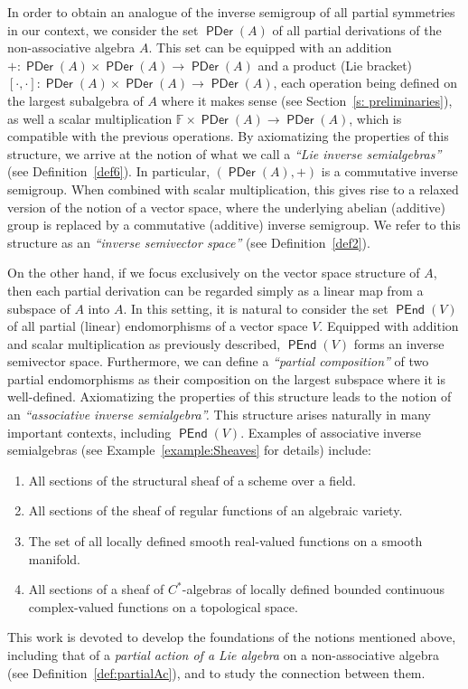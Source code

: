 \documentclass{amsart}
\newcommand{\F}{\mathbb{F}}
\newcommand{\0}{{\vartheta}}
\theoremstyle{definition}
\theoremstyle{remark}
\numberwithin{equation}{section}
\newtheorem*{Theorem A}{\textbf{Theorem A}}
\newtheorem*{Corollary E}{\textbf{Corollary E}}
\newtheorem*{Corollary F}{\textbf{Corollary F}}
\newtheorem*{Theorem B}{\textbf{Theorem B}}
\newtheorem*{Theorem C}{\textbf{Theorem C}}
\newtheorem*{Theorem D}{\textbf{Theorem B}}
\newtheorem*{p a}{\textbf{Proof of  Theorem A}}
\newtheorem*{p b}{\textbf{Proof of Theorem B}}
\newtheorem*{p c}{\textbf{Proof of  Theorem C}}
\newtheorem*{p d}{\textbf{Proof of  Theorem D}}
\DeclareMathOperator{\pen}{\textsf{PEnd}}
\DeclareMathOperator{\pde}{\textsf{PDer}}
\begin{document}
In order to obtain an analogue of the inverse semigroup of all partial symmetries in our context, we consider the set $\pde(A)$ of all partial derivations of the non-associative algebra $A$. This set can be equipped with an addition $+:\pde(A)\times \pde(A)\to \pde(A)$ and a product (Lie bracket) $[\cdot,\cdot]:\pde(A)\times \pde(A)\to \pde(A)$, each operation being defined on the largest subalgebra of $A$ where it makes sense (see Section~\ref{s: preliminaries}), as well a  scalar multiplication $\F\times \pde(A)\to \pde(A)$, which is compatible with the previous operations. By axiomatizing the properties of this structure, we arrive at the  notion of what we call a {\em ``Lie inverse semialgebras''} (see Definition~\ref{def6}). In particular, $(\pde(A),+)$ is a commutative inverse semigroup. When combined with scalar multiplication, this gives rise to a relaxed version of the notion of a vector space, where the underlying abelian (additive) group is replaced by a commutative (additive) inverse semigroup. We refer to this structure as an {\em ``inverse semivector space''} (see Definition~\ref{def2}).

On the other hand, if we focus exclusively on the vector space structure of $A$, then each partial derivation can be regarded simply as a linear map from a subspace of $A$ into $A$. In this setting, it is natural to consider the set $\pen(V)$ of all partial (linear) endomorphisms of a vector space $V.$ Equipped with addition and scalar multiplication as previously described, $\pen(V)$ forms an inverse semivector space. Furthermore, we can define a {\em ``partial composition''} of two partial endomorphisms as their composition on the largest subspace where it is well-defined. Axiomatizing the properties of this structure leads to the notion of an {\em ``associative inverse semialgebra''.} This structure arises naturally in many important contexts,  including  $\pen(V).$ Examples of associative inverse semialgebras (see Example~\ref{example:Sheaves} for details)
include:
\begin{enumerate}
\item  All sections of the structural sheaf of a scheme  over  a field.
\item All sections of the sheaf of regular functions of an algebraic variety.
\item The set of all locally defined smooth real-valued functions on a smooth manifold.
\item All sections of a sheaf of $C^*$-algebras of locally defined bounded continuous complex-valued functions on a topological space.
\end{enumerate}
 This work is devoted to develop the foundations of the notions mentioned above, including that  of  a \emph{partial action of a Lie algebra} on a non-associative algebra (see Definition~\ref{def:partialAc}), and to study the connection between them.
\end{document}
